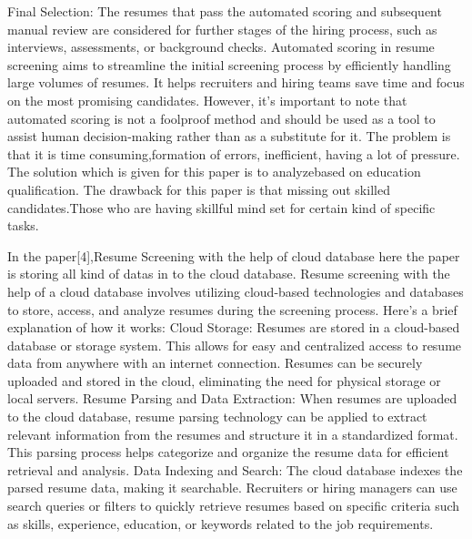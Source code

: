 \documentclass[12 pt, oneside]{book}
\begin{document}
\newline
Final Selection: The resumes that pass the automated scoring and subsequent manual review are considered for further stages of the hiring process, such as interviews, assessments, or background checks.
\newline
Automated scoring in resume screening aims to streamline the initial screening process by efficiently handling large volumes of resumes. It helps recruiters and hiring teams save time and focus on the most promising candidates. However, it's important to note that automated scoring is not a foolproof method and should be used as a tool to assist human decision-making rather than as a substitute for it.
\newline
The problem is that it is time consuming,formation of errors, inefficient, having a lot of pressure. The solution which is given for this paper is to analyzebased on education qualification. The drawback for this paper is that missing out skilled candidates.Those who are having skillful mind set for certain kind of specific tasks.
\bigskip
\par In the paper[4],Resume Screening with the help of cloud database 
here the paper is storing all kind of datas in to the cloud database.
Resume screening with the help of a cloud database involves utilizing cloud-based technologies and databases to store, access, and analyze resumes during the screening process. Here's a brief explanation of how it works:
\newline
Cloud Storage: Resumes are stored in a cloud-based database or storage system. This allows for easy and centralized access to resume data from anywhere with an internet connection. Resumes can be securely uploaded and stored in the cloud, eliminating the need for physical storage or local servers.
\newline
Resume Parsing and Data Extraction: When resumes are uploaded to the cloud database, resume parsing technology can be applied to extract relevant information from the resumes and structure it in a standardized format. This parsing process helps categorize and organize the resume data for efficient retrieval and analysis.
\newline
Data Indexing and Search: The cloud database indexes the parsed resume data, making it searchable. Recruiters or hiring managers can use search queries or filters to quickly retrieve resumes based on specific criteria such as skills, experience, education, or keywords related to the job requirements.
\newline
\end{document}
